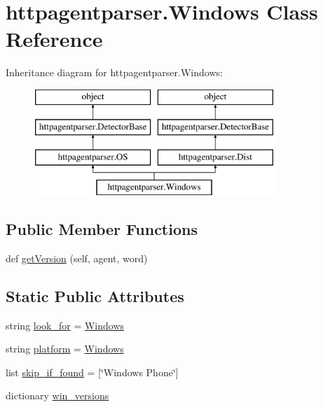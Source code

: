 \hypertarget{classhttpagentparser_1_1_windows}{}\section{httpagentparser.\+Windows Class Reference}
\label{classhttpagentparser_1_1_windows}
Inheritance diagram for httpagentparser.\+Windows\+:\begin{figure}[H]
\begin{center}
\leavevmode
\includegraphics[height=4.000000cm]{classhttpagentparser_1_1_windows}
\end{center}
\end{figure}
\subsection*{Public Member Functions}
\begin{DoxyCompactItemize}
\item 
def \hyperlink{classhttpagentparser_1_1_windows_a49b32a00eec20a975680d1fba0def559}{get\+Version} (self, agent, word)
\end{DoxyCompactItemize}
\subsection*{Static Public Attributes}
\begin{DoxyCompactItemize}
\item 
string \hyperlink{classhttpagentparser_1_1_windows_a81b00b5dfc77386615d0ebbd4754991f}{look\+\_\+for} = \textquotesingle{}\hyperlink{classhttpagentparser_1_1_windows}{Windows}\textquotesingle{}
\item 
string \hyperlink{classhttpagentparser_1_1_windows_a37cdb17921c22c582c5af558c7b3b951}{platform} = \textquotesingle{}\hyperlink{classhttpagentparser_1_1_windows}{Windows}\textquotesingle{}
\item 
list \hyperlink{classhttpagentparser_1_1_windows_adc13ce268b0ac1525c9ac8d7ad5f9561}{skip\+\_\+if\+\_\+found} = \mbox{[}\char`\"{}Windows Phone\char`\"{}\mbox{]}
\item 
dictionary \hyperlink{classhttpagentparser_1_1_windows_a178576c8bc664b7a6714ca6af403587c}{win\+\_\+versions}
\end{DoxyCompactItemize}
